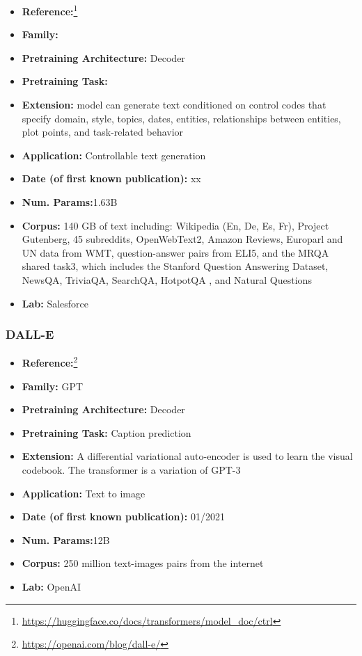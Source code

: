 \documentclass{article}
\begin{document}
            \begin{itemize}
                \item \textbf{Reference:}\footnote{\url{https://huggingface.co/docs/transformers/model_doc/ctrl}}\cite{keskar2019ctrl}
                \item \textbf{Family:} 
                \item \textbf{Pretraining Architecture:} Decoder
                \item \textbf{Pretraining Task:}
                \item \textbf{Extension:} model can generate text conditioned on control codes that specify domain, style, topics, dates, entities, relationships between entities, plot points, and task-related behavior  
                \item \textbf{Application:} Controllable text generation
                \item \textbf{Date (of first known publication):} xx
                \item \textbf{Num. Params:}1.63B
                \item \textbf{Corpus:} 140 GB of text including: Wikipedia (En, De, Es, Fr), Project Gutenberg, 45 subreddits, OpenWebText2, Amazon Reviews, Europarl and UN data from WMT, question-answer pairs from ELI5, and the MRQA shared task3, which includes the Stanford Question Answering Dataset, NewsQA, TriviaQA, SearchQA, HotpotQA , and Natural Questions
                \item \textbf{Lab:} Salesforce
            \end{itemize}
            
\subsubsection{DALL-E}

            \begin{itemize}
                \item \textbf{Reference:}\footnote{\url{https://openai.com/blog/dall-e/}}\cite{ramesh2021zero}
                \item \textbf{Family:} GPT 
                \item \textbf{Pretraining Architecture:} Decoder
                \item \textbf{Pretraining Task:} Caption prediction
                \item \textbf{Extension:} A differential variational auto-encoder is used to learn the visual codebook. The transformer is a variation of GPT-3  
                \item \textbf{Application:} Text to image
                \item \textbf{Date (of first known publication):} 01/2021
                \item \textbf{Num. Params:}12B
                \item \textbf{Corpus:} 250 million text-images pairs from the internet
                \item \textbf{Lab:} OpenAI
            \end{itemize}
            
\end{document}
